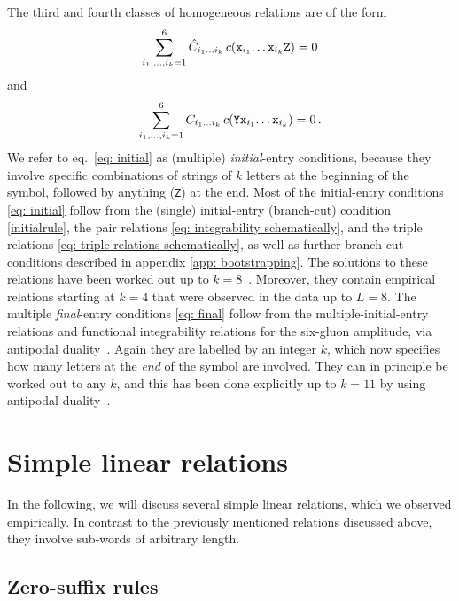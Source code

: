 \documentclass[12pt]{article}
\begin{document}
The third and fourth classes of homogeneous relations are of the form 
\begin{equation}
\label{eq: initial}
    \sum_{i_1,\dots,i_k=1}^6 \hat{C}_{i_1\dots i_k} \, c({\tt x}_{i_1}{\tt\dots x}_{i_k}{\tt Z})=0
\end{equation}
and 
\begin{equation}
\label{eq: final}
    \sum_{i_1,\dots,i_k=1}^6 \tilde{C}_{i_1\dots i_k} \, c({\tt Y}{\tt x}_{i_1}{\tt \dots x}_{i_k})=0\,.
\end{equation}
%
We refer to eq.~\eqref{eq: initial} as (multiple) {\it initial}-entry conditions, because they involve specific combinations of strings of $k$ letters at the beginning of the symbol, followed by anything ({\tt Z}) at the end.
Most of the initial-entry conditions \eqref{eq: initial} follow from the (single) initial-entry (branch-cut) condition \ref{initialrule}, the pair relations \eqref{eq: integrability schematically}, and the triple relations \eqref{eq: triple relations schematically}, as well as further branch-cut conditions described in appendix \ref{app: bootstrapping}. The solutions to these relations have been worked out up to $k=8$~\citep{Dixon:2022rse}. Moreover, they contain empirical relations starting at $k=4$ that were observed in the data up to $L=8$.
The multiple {\it final}-entry conditions \eqref{eq: final} follow from the multiple-initial-entry relations and functional integrability relations for the six-gluon amplitude, via antipodal duality~\citep{Dixon:2021tdw}. Again they are labelled by an integer $k$, which now specifies how many letters at the \emph{end} of the symbol are involved. They can in principle be worked out to any $k$, and this has been done explicitly up to $k=11$ by using antipodal duality~\citep{Caron-Huot:2019bsq}.


\section{Simple linear relations}\label{sec:empiricalrelations}

In the following, we will discuss several simple linear relations, which we observed empirically. In contrast to the previously mentioned relations discussed above, they involve sub-words of arbitrary length.

\subsection{Zero-suffix rules}
\label{sec:zerosuffix}
\end{document}
